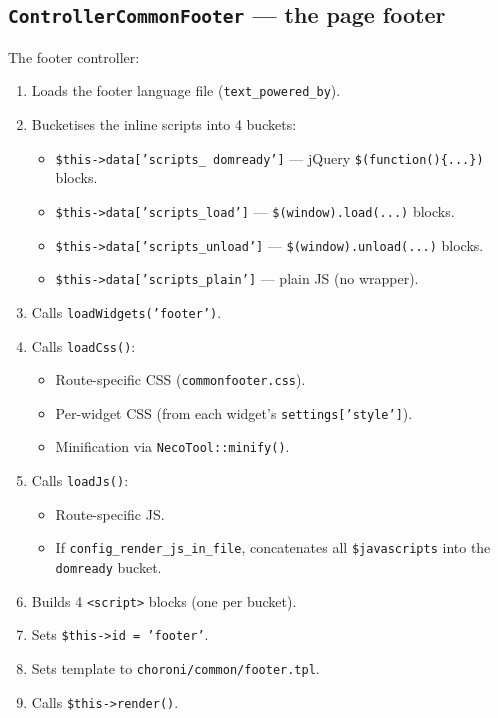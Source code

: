 \documentclass[11pt,a4paper]{article}
\begin{document}
\subsection{\texttt{ControllerCommonFooter} --- the page footer}

The footer controller:

\begin{enumerate}[leftmargin=1.6em,itemsep=2pt]
  \item Loads the footer language file (\texttt{text\_powered\_by}).
  \item Bucketises the inline scripts into 4 buckets:
        \begin{itemize}[itemsep=2pt]
          \item \texttt{\$this->data['scripts\_ domready']} ---
                jQuery \texttt{\$(function()\{...\})} blocks.
          \item \texttt{\$this->data['scripts\_load']} ---
                \texttt{\$(window).load(...)} blocks.
          \item \texttt{\$this->data['scripts\_unload']} ---
                \texttt{\$(window).unload(...)} blocks.
          \item \texttt{\$this->data['scripts\_plain']} ---
                plain JS (no wrapper).
        \end{itemize}
  \item Calls \texttt{loadWidgets('footer')}.
  \item Calls \texttt{loadCss()}:
        \begin{itemize}[itemsep=2pt]
          \item Route-specific CSS (\texttt{commonfooter.css}).
          \item Per-widget CSS (from each widget's
                \texttt{settings['style']}).
          \item Minification via \texttt{NecoTool::minify()}.
        \end{itemize}
  \item Calls \texttt{loadJs()}:
        \begin{itemize}[itemsep=2pt]
          \item Route-specific JS.
          \item If \texttt{config\_render\_js\_in\_file},
                concatenates all \texttt{\$javascripts} into the
                \texttt{domready} bucket.
        \end{itemize}
  \item Builds 4 \texttt{<script>} blocks (one per bucket).
  \item Sets \texttt{\$this->id = 'footer'}.
  \item Sets template to \texttt{choroni/common/footer.tpl}.
  \item Calls \texttt{\$this->render()}.
\end{enumerate}
\end{document}
